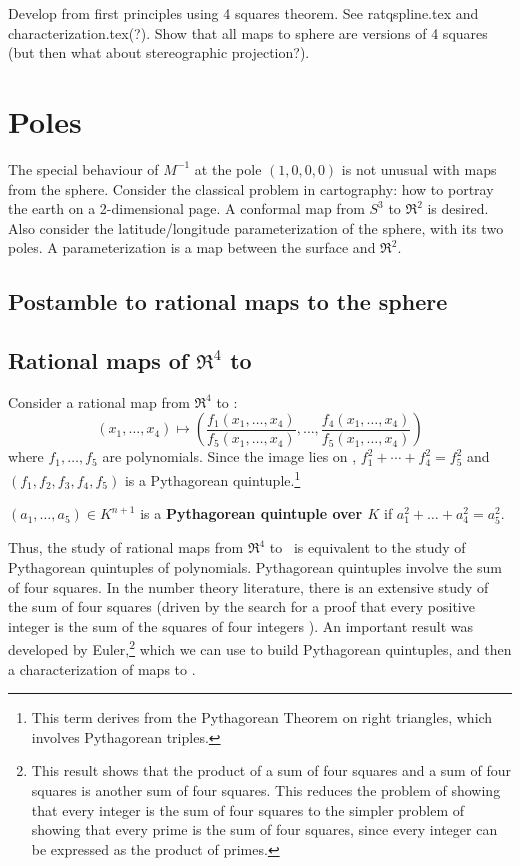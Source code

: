 \documentclass[11pt]{article}
\begin{document}
Develop from first principles using 4 squares theorem.
See ratqspline.tex and characterization.tex(?).
Show that all maps to sphere are versions of 4 squares (but then what about stereographic
projection?).

\section{Poles}

The special behaviour of $M^{-1}$ at the pole $(1,0,0,0)$
is not unusual with maps from the sphere.
Consider the classical problem in cartography: how to portray the earth
on a 2-dimensional page.
A conformal map from $S^3$ to $\Re^2$ is desired.
Also consider the latitude/longitude parameterization of the sphere, with its two poles.
A parameterization is a map between the surface and $\Re^2$.

\subsection{Postamble to rational maps to the sphere}


\subsection{Rational maps of $\Re^4$ to }

Consider a rational map from $\Re^4$ to :
\[
	(x_1,\ldots,x_4) \mapsto
	(\frac{f_1(x_1,\ldots,x_4)}{f_{5}(x_1,\ldots,x_4)}, \ldots,
	 \frac{f_4(x_1,\ldots,x_4)}{f_{5}(x_1,\ldots,x_4)})
\]
where $f_1,\ldots,f_{5}$ are polynomials.
Since the image lies on , $f_1^2 + \cdots + f_4^2 = f_{5}^2$
and $(f_1,f_2,f_3,f_4,f_5)$ is a Pythagorean quintuple.\footnote{This term derives
	from the Pythagorean Theorem on right triangles,
	which involves Pythagorean triples.}
\begin{defn2}
$(a_1,\ldots,a_{5}) \in K^{n+1}$
is a {\bf Pythagorean quintuple over $K$} 
if $a_1^2 + \ldots + a_4^2 = a_5^2$.
\end{defn2}
%
Thus, the study of rational maps from $\Re^{4}$ to \ 
is equivalent to the study of Pythagorean quintuples of polynomials.
Pythagorean quintuples involve the sum of four squares.
In the number theory literature, there is an extensive study of the
sum of four squares (driven by the search for a proof that
every positive integer is the sum of the squares of four integers \cite{dickson52}).
An important result was developed by Euler,\footnote{This result shows that the product of a sum of four squares and a sum of four
	squares is another sum of four squares.
	This reduces the problem of showing that every integer is the sum
	of four squares to the simpler problem
	of showing that every prime is the sum of four squares,
	since every integer can be expressed as the product of primes.}
which we can use to build Pythagorean quintuples, 
and then a characterization of maps to .
\end{document}
